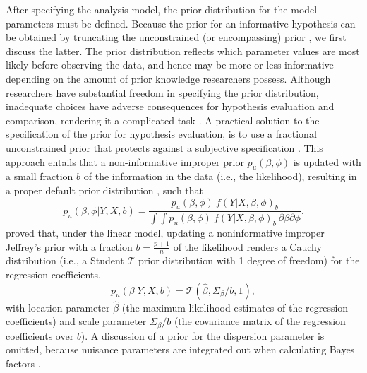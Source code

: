 \documentclass[review, 3p, authoryear]{elsarticle} %
\begin{document}
After specifying the analysis model, the prior distribution for the model parameters must be defined.
Because the prior for an informative hypothesis can be obtained by truncating the unconstrained (or encompassing) prior \citep[e.g.,][]{klugkist_inequality_2005}, we first discuss the latter.
The prior distribution reflects which parameter values are most likely before observing the data, and hence may be more or less informative depending on the amount of prior knowledge researchers possess.
Although researchers have substantial freedom in specifying the prior distribution, inadequate choices have adverse consequences for hypothesis evaluation and comparison, rendering it a complicated task \citep{ohagan_fractional_1995}.
A practical solution to the specification of the prior for hypothesis evaluation, is to use a fractional unconstrained prior \citep{ohagan_fractional_1995} that protects against a subjective specification \citep{gu_approximated_2018}.
This approach entails that a non-informative improper prior \(p_u(\beta, \phi)\) is updated with a small fraction \(b\) of the information in the data (i.e., the likelihood), resulting in a proper default prior distribution \citep[e.g.,][]{mulder_equality_2010, gu_approximated_2018}, such that
\[
p_u(\beta, \phi|Y, X, b) = 
\frac{
  p_u(\beta, \phi) ~ f(Y|X, \beta, \phi)_b
}{
  \int \int p_u(\beta, \phi) ~ f(Y|X, \beta, \phi)_b ~ \partial \beta \partial \phi
}.
\]
\citet{mulder_olssoncollentine_2019} proved that, under the linear model, updating a noninformative improper Jeffrey's prior with a fraction \(b = \frac{p+1}{n}\) of the likelihood renders a Cauchy distribution (i.e., a Student \(\mathcal{T}\) prior distribution with 1 degree of freedom) for the regression coefficients,
\[
p_u(\beta | Y, X, b) = \mathcal{T}(\hat{\beta}, \Sigma_\beta / b, 1),
\]
with location parameter \(\hat{\beta}\) (the maximum likelihood estimates of the regression coefficients) and scale parameter \(\Sigma_{\beta} / b\) (the covariance matrix of the regression coefficients over \(b\)). A discussion of a prior for the dispersion parameter is omitted, because nuisance parameters are integrated out when calculating Bayes factors \citep[e.g.,][]{gu_approximated_2018}.
\end{document}
